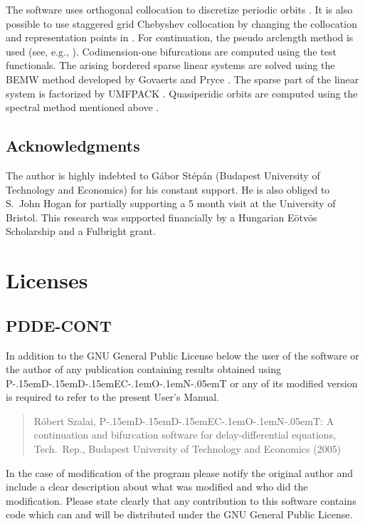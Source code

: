 \documentclass[10pt,a4paper]{ddedoc}
\def\pdde{{P\kern-.15emD\kern-.15emD\kern-.15emE\raisebox{.25ex}{-}C\kern-.1emO\kern-.1emN\kern-.05emT}}
\begin{document}
The software uses orthogonal collocation to discretize periodic orbits
\cite{engstab,engcol}. It is also possible to use staggered grid Chebyshev
collocation \cite{kopriva} by changing the collocation and representation points
in . For continuation, the pseudo arclength method is
used (see, e.g., \cite{handbook, tutorial1, tutorial2}). Codimension-one
bifurcations are computed using the test functionals. The arising bordered
sparse linear systems are solved using the BEMW method developed by Govaerts and
Pryce \cite{Gov1993}. The sparse part of the linear system is factorized by
UMFPACK \cite{umfpack}. Quasiperidic orbits are computed using the spectral
method mentioned above \cite{kopriva,roose-szalai}.

\subsection*{Acknowledgments}

The author is highly indebted to G\'abor St\'ep\'an (Budapest University of 
Technology and Economics) for his constant support. He is also
obliged to S.~John Hogan for partially supporting a 5 month visit at the
University of Bristol.
This research was supported financially by a Hungarian E\"otv\"os Scholarship
and a Fulbright grant.

\appendix

\section{Licenses}

\subsection{PDDE-CONT}

In addition to the GNU General Public License below the user of the software or
the author of any
publication containing results obtained using \pdde{} or any of its modified
version is required to refer to the present User's Manual.
\begin{quote}
R\'obert Szalai, \pdde{}: A continuation and bifurcation software for 
delay-differential equations, Tech.\ Rep., Budapest University of Technology
and Economics (2005)
\end{quote}
In the case of modification of the program please notify the original author and
include a clear description about what was modified and who did the 
modification. Please state clearly that any contribution to this software
contains code which can and will be distributed under the GNU General Public
License.
\end{document}
